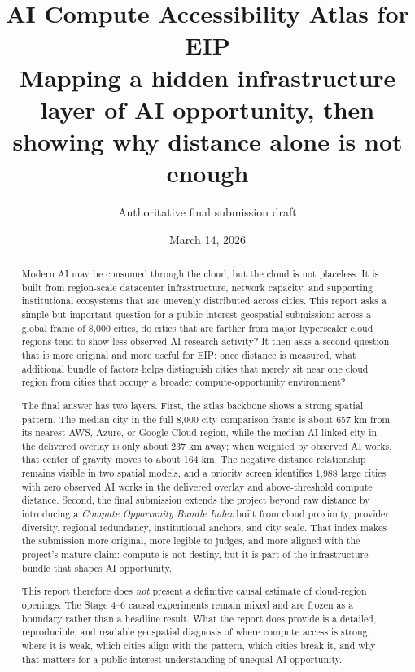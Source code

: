 \documentclass[11pt]{article}
\title{\textbf{AI Compute Accessibility Atlas for EIP}\\
\large Mapping a hidden infrastructure layer of AI opportunity, then showing why distance alone is not enough}
\author{Authoritative final submission draft}
\date{March 14, 2026}
\begin{document}
\maketitle

\begin{abstract}
Modern AI may be consumed through the cloud, but the cloud is not placeless. It is built from region-scale datacenter infrastructure, network capacity, and supporting institutional ecosystems that are unevenly distributed across cities. This report asks a simple but important question for a public-interest geospatial submission: across a global frame of 8,000 cities, do cities that are farther from major hyperscaler cloud regions tend to show less observed AI research activity? It then asks a second question that is more original and more useful for EIP: once distance is measured, what additional bundle of factors helps distinguish cities that merely sit near one cloud region from cities that occupy a broader compute-opportunity environment?

The final answer has two layers. First, the atlas backbone shows a strong spatial pattern. The median city in the full 8,000-city comparison frame is about 657 km from its nearest AWS, Azure, or Google Cloud region, while the median AI-linked city in the delivered overlay is only about 237 km away; when weighted by observed AI works, that center of gravity moves to about 164 km. The negative distance relationship remains visible in two spatial models, and a priority screen identifies 1,988 large cities with zero observed AI works in the delivered overlay and above-threshold compute distance. Second, the final submission extends the project beyond raw distance by introducing a \emph{Compute Opportunity Bundle Index} built from cloud proximity, provider diversity, regional redundancy, institutional anchors, and city scale. That index makes the submission more original, more legible to judges, and more aligned with the project’s mature claim: compute is not destiny, but it is part of the infrastructure bundle that shapes AI opportunity.

This report therefore does \emph{not} present a definitive causal estimate of cloud-region openings. The Stage 4--6 causal experiments remain mixed and are frozen as a boundary rather than a headline result. What the report does provide is a detailed, reproducible, and readable geospatial diagnosis of where compute access is strong, where it is weak, which cities align with the pattern, which cities break it, and why that matters for a public-interest understanding of unequal AI opportunity.
\end{abstract}
\end{document}
